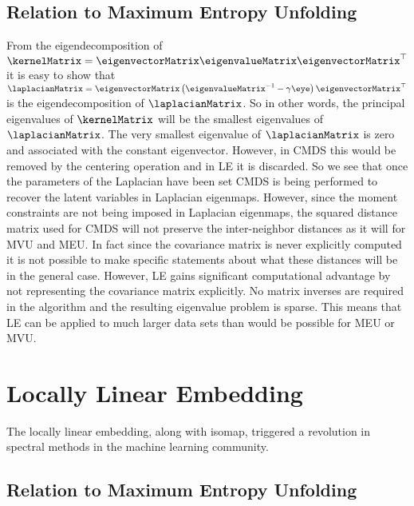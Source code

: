 \subsection{Relation to Maximum Entropy Unfolding}

From the eigendecomposition of
$\kernelMatrix =
\eigenvectorMatrix\eigenvalueMatrix\eigenvectorMatrix^\top$ it is easy
to show that $\laplacianMatrix = \eigenvectorMatrix
\left(\eigenvalueMatrix^{-1}-\gamma\eye\right)\eigenvectorMatrix^\top$
is the eigendecomposition of $\laplacianMatrix$. So in other words,
the principal eigenvalues of $\kernelMatrix$ will be the smallest
eigenvalues of $\laplacianMatrix$. The very smallest eigenvalue of
$\laplacianMatrix$ is zero and associated with the constant
eigenvector. However, in CMDS this would be removed by the centering
operation and in LE it is discarded. So we see that once the
parameters of the Laplacian have been set CMDS is being performed to
recover the latent variables in Laplacian eigenmaps. However, since
the moment constraints are not being imposed in Laplacian eigenmaps,
the squared distance matrix used for CMDS will not preserve the
inter-neighbor distances as it will for MVU and MEU. In fact since the
covariance matrix is never explicitly computed it is not possible to
make specific statements about what these distances will be in the
general case. However, LE gains significant computational advantage by
not representing the covariance matrix explicitly. No matrix inverses
are required in the algorithm and the resulting eigenvalue problem is
sparse. This means that LE can be applied to much larger data sets
than would be possible for MEU or MVU.

\section{Locally Linear Embedding}\label{sec:lle}

The locally linear embedding, along with isomap, triggered a revolution in spectral methods in the machine learning community. 



\subsection{Relation to Maximum Entropy Unfolding}

